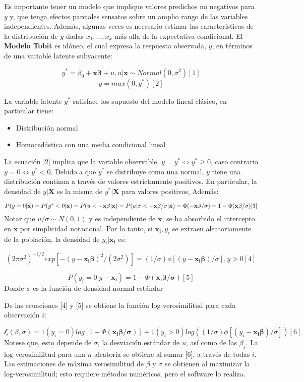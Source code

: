 \documentclass[
  letterpaper,
  DIV=11,
  numbers=noendperiod]{scrreprt}
\begin{document}
Es importante tener un modelo que implique valores predichos no
negativos para \(y\) y, que tenga efectos parciales sensatos sobre un
amplio rango de las variables independientes. Además, algunas veces es
necesario estimar las características de la distribución de \(y\) dadas
\(x_1,...,x_k\) más alla de la expectativa condicional. El
\textbf{Modelo Tobit} es idóneo, el cual expresa la respuesta observada,
\(y\), en términos de una variable latente subyacente:

\[y^*=\beta_0+\mathbf{x\beta}+u, u|\mathbf{x}\sim Normal(0,\sigma^2)[1]\]
\[y=max(0,y^*)[2]\]

La variable latente \(y^*\) satisface los supuesto del modelo lineal
clásico, en particular tiene:

\begin{itemize}
\item
  Distribución normal
\item
  Homocedástica con una media condicional lineal
\end{itemize}

La ecuación {[}2{]} implica que la variable observable,
\(y=y^*\Leftrightarrow y^*\geq0\), caso contrario
\(y=0\Leftrightarrow y^*<0\). Debido a que \(y^*\) se distribuye como
una normal, \(y\) tiene una distribución continua a través de valores
estrictamente positivos. En particular, la densidad de \(y|\mathbf{X}\)
es la misma de \(y^*|\mathbf{X}\) para valores positivos, Además:

\[P(y=0|\mathbf{x})=P(y^*<0|\mathbf{x})=P(u<-\mathbf{x\beta}|\mathbf{x})=\\P(u|\sigma<-\mathbf{x\beta/\sigma|x})=\Phi(\mathbf{-x\beta/\sigma})=1-\Phi(\mathbf{x\beta/\sigma}) [3]\]
Notar que \(u/\sigma\sim N(0,1)\) y es independiente de \(\mathbf{x}\);
se ha absorbido el intercepto en \(\mathbf{x}\) por simplicidad
notacional. Por lo tanto, si \(\mathbf{x_i},y_i\) se extraen
aleatoriamente de la población, la densidad de \(y_i|\mathbf{x_i}\) es:

\[(2\pi\sigma^2)^{-1/2}exp[-(y-\mathbf{x_i\beta})^2/(2\sigma^2)]=(1/\sigma)\phi[(y-\mathbf{x_i\beta})/\sigma], y>0[4]\]

\[P(y_i=0|y-\mathbf{x_i})=1-\Phi(\mathbf{x_i\beta/\sigma})[5]\] Donde
\(\phi\) es la función de densidad normal estándar

De las ecuaciones {[}4{]} y {[}5{]} se obtiene la función
log-verosimilitud para cada observación \(i\):

\[\mathcal{l_i(\beta,\sigma)}=1(y_i=0)log[1-\Phi(\mathbf{x_i\beta/\sigma})]+1(y_i>0)log((1/\sigma)\phi[(y_i-\mathbf{x_i\beta})/\sigma]) [6]\]
Notese que, esto depende de \(\sigma\), la desviación estándar de \(u\),
así como de las \(\beta_j\). La log-verosimilitud para una \(n\)
aleatoria se obtiene al sumar {[}6{]}, a través de todas \(i\). Las
estimaciones de máxima verosimilitud de \(\beta\) y \(\sigma\) se
obtienen al maximizar la log-verosimilitud; esto requiere métodos
numéricos, pero el software lo realiza.
\end{document}
